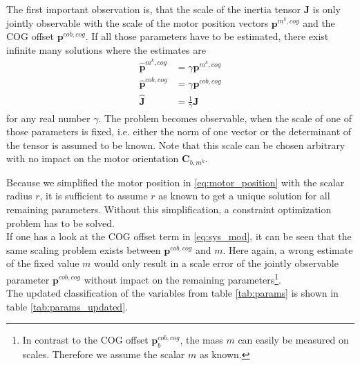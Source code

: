 The first important observation is, that the scale of the inertia tensor $\mathbf{J}$ is only jointly observable with the scale of the motor position vectors $\mathbf{p}^{m^k,cog}$ and the COG offset $\mathbf{p}^{cob,cog}$.
If all those parameters have to be estimated, there exist infinite many solutions where the estimates are
\begin{equation}
\begin{aligned}
 \hat{\mathbf{p}}^{m^k,cog} &= \gamma \mathbf{p}^{m^k,cog} \\
 \hat{\mathbf{p}}^{cob,cog} &= \gamma \mathbf{p}^{cob,cog} \\
 \hat{\mathbf{J}}           &= \frac{1}{\gamma} \mathbf{J}
\end{aligned}
\end{equation}
for any real number $\gamma$.
The problem becomes observable, when the scale of one of those parameters is fixed, i.e. either the norm of one vector or the determinant of the tensor is assumed to be known.
Note that this scale can be chosen arbitrary with no impact on the motor orientation $\mathbf{C}_{b,m^k}$.

Because we simplified the motor position in \cref{eq:motor_position} with the scalar radius $r$, it is sufficient to assume $r$ as known to get a unique solution for all remaining parameters.
Without this simplification, a constraint optimization problem has to be solved.
\\

If one has a look at the COG offset term in \cref{eq:sys_mod}, it can be seen that the same scaling problem exists between $\mathbf{p}^{cob,cog}$ and $m$.
Here again, a wrong estimate of the fixed value $m$
would only result in a scale error of the jointly observable parameter $\mathbf{p}^{cob,cog}$ without impact on the remaining parameters\footnote{
In contrast to the COG offset $\mathbf{p}^{cob,cog}_{b}$, the mass $m$ can easily be measured on scales. Therefore we assume the scalar $m$ as known.}.
\\
The updated classification of the variables from table \ref{tab:params} is shown in table \ref{tab:params_updated}.

